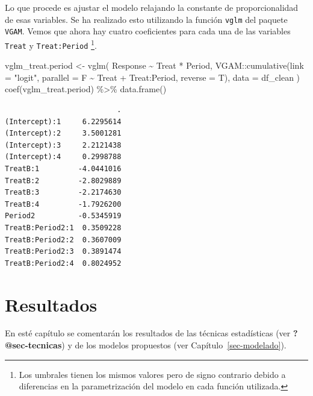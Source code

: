 \documentclass[
  12pt,
  a4paper,
  extrafontsizes,
  onecolumn,
  openright]{memoir}
\newenvironment{Shaded}{\begin{snugshade}}{\end{snugshade}}
\newcommand{\AttributeTok}[1]{\textcolor[rgb]{0.40,0.45,0.13}{#1}}
\newcommand{\FunctionTok}[1]{\textcolor[rgb]{0.28,0.35,0.67}{#1}}
\newcommand{\NormalTok}[1]{\textcolor[rgb]{0.00,0.23,0.31}{#1}}
\newcommand{\OtherTok}[1]{\textcolor[rgb]{0.00,0.23,0.31}{#1}}
\newcommand{\SpecialCharTok}[1]{\textcolor[rgb]{0.37,0.37,0.37}{#1}}
\newcommand{\StringTok}[1]{\textcolor[rgb]{0.13,0.47,0.30}{#1}}
\begin{document}
\normalsize

Lo que procede es ajustar el modelo relajando la constante de
proporcionalidad de esas variables. Se ha realizado esto utilizando la
función \texttt{vglm} del paquete \texttt{VGAM}. Vemos que ahora hay
cuatro coeficientes para cada una de las variables \texttt{Treat} y
\texttt{Treat:Period} \footnote{Los umbrales tienen los mismos valores
  pero de signo contrario debido a diferencias en la parametrización del
  modelo en cada función utilizada.}.

\scriptsize

\begin{Shaded}
\begin{Highlighting}[]
\NormalTok{vglm\_treat.period }\OtherTok{\textless{}{-}} \FunctionTok{vglm}\NormalTok{(}
\NormalTok{    Response }\SpecialCharTok{\textasciitilde{}}\NormalTok{ Treat }\SpecialCharTok{*}\NormalTok{ Period,}
\NormalTok{    VGAM}\SpecialCharTok{::}\FunctionTok{cumulative}\NormalTok{(}\AttributeTok{link =} \StringTok{"logit"}\NormalTok{, }\AttributeTok{parallel =}\NormalTok{ F }\SpecialCharTok{\textasciitilde{}}\NormalTok{ Treat }\SpecialCharTok{+}\NormalTok{ Treat}\SpecialCharTok{:}\NormalTok{Period, }\AttributeTok{reverse =}\NormalTok{ T),}
    \AttributeTok{data =}\NormalTok{ df\_clean}
\NormalTok{)}
\FunctionTok{coef}\NormalTok{(vglm\_treat.period) }\SpecialCharTok{\%\textgreater{}\%} \FunctionTok{data.frame}\NormalTok{()}
\end{Highlighting}
\end{Shaded}

\begin{verbatim}
                          .
(Intercept):1     6.2295614
(Intercept):2     3.5001281
(Intercept):3     2.2121438
(Intercept):4     0.2998788
TreatB:1         -4.0441016
TreatB:2         -2.8029889
TreatB:3         -2.2174630
TreatB:4         -1.7926200
Period2          -0.5345919
TreatB:Period2:1  0.3509228
TreatB:Period2:2  0.3607009
TreatB:Period2:3  0.3891474
TreatB:Period2:4  0.8024952
\end{verbatim}

\normalsize


\hypertarget{sec-resultados}{%
\chapter{Resultados}\label{sec-resultados}}

En esté capítulo se comentarán los resultados de las técnicas
estadísticas (ver \textbf{?@sec-tecnicas}) y de los modelos propuestos
(ver Capítulo~\ref{sec-modelado}).
\end{document}

